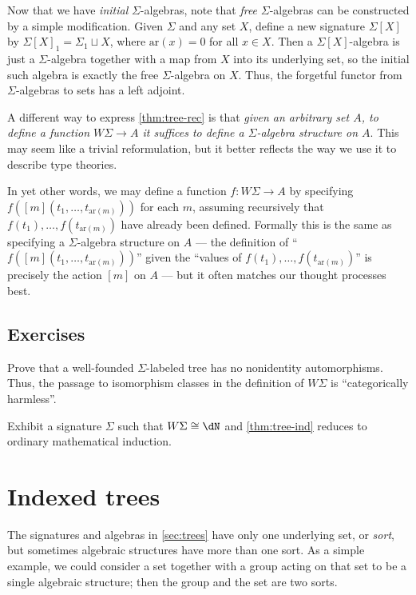 \documentclass{book}
\def\ay{\mathrm{ar}}
\def\sig{\Sigma}
\def\act#1{[#1]}
\begin{document}
Now that we have \emph{initial} $\sig$-algebras, note that \emph{free} $\sig$-algebras can be constructed by a simple modification.
Given $\sig$ and any set $X$, define a new signature $\sig[X]$ by $\sig[X]_1 = \sig_1 \sqcup X$, where $\ay(x)=0$ for all $x\in X$.
Then a $\sig[X]$-algebra is just a $\sig$-algebra together with a map from $X$ into its underlying set, so the initial such algebra is exactly the free $\sig$-algebra on $X$.
Thus, the forgetful functor from $\sig$-algebras to sets has a left adjoint.

A different way to express \cref{thm:tree-rec} is that \emph{given an arbitrary set $A$, to define a function $W\sig \to A$ it suffices to define a $\sig$-algebra structure on $A$}.
This may seem like a trivial reformulation, but it better reflects the way we use it to describe type theories.

In yet other words, we may define a function $f:W\sig \to A$ by specifying $f(\act m(t_1,\dots,t_{\ay(m)}))$ for each $m$, assuming recursively that $f(t_1),\dots,f(t_{\ay(m)})$ have already been defined.
Formally this is the same as specifying a $\sig$-algebra structure on $A$ --- the definition of ``$f(\act m(t_1,\dots,t_{\ay(m)}))$'' given the ``values of $f(t_1),\dots,f(t_{\ay(m)})$'' is precisely the action $\act m$ on $A$ --- but it often matches our thought processes best.

\subsection*{Exercises}

\begin{ex}\label{ex:wf-rigid}
  Prove that a well-founded $\sig$-labeled tree has no nonidentity automorphisms.
  Thus, the passage to isomorphism classes in the definition of $W\sig$ is ``categorically harmless''.
\end{ex}

\begin{ex}\label{ex:natw}
  Exhibit a signature $\sig$ such that $W\sig \cong \dN$ and \cref{thm:tree-ind} reduces to ordinary mathematical induction.
\end{ex}


\section{Indexed trees}
\label{sec:indexed-trees}

The signatures and algebras in \cref{sec:trees} have only one underlying set, or \emph{sort}, but sometimes algebraic structures have more than one sort.
As a simple example, we could consider a set together with a group acting on that set to be a single algebraic structure; then the group and the set are two sorts.
\end{document}
